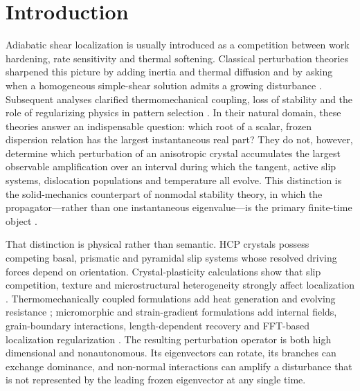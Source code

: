 \section{Introduction}
\label{sec:introduction_dynamic}

Adiabatic shear localization is usually introduced as a competition between work hardening, rate sensitivity and thermal softening. Classical perturbation theories sharpened this picture by adding inertia and thermal diffusion and by asking when a homogeneous simple-shear solution admits a growing disturbance \cite{Bai1982,BaiDodd1992,Wright2002,WrightBatra1985,MolinariClifton1987}. Subsequent analyses clarified thermomechanical coupling, loss of stability and the role of regularizing physics in pattern selection \cite{BenallalBigoni2004,ArriagaWaisman2017,JacqueyRattezVeveakis2021}. In their natural domain, these theories answer an indispensable question: which root of a scalar, frozen dispersion relation has the largest instantaneous real part? They do not, however, determine which perturbation of an anisotropic crystal accumulates the largest observable amplification over an interval during which the tangent, active slip systems, dislocation populations and temperature all evolve. This distinction is the solid-mechanics counterpart of nonmodal stability theory, in which the propagator---rather than one instantaneous eigenvalue---is the primary finite-time object \cite{Schmid2007}.

That distinction is physical rather than semantic. HCP crystals possess competing basal, prismatic and pyramidal slip systems whose resolved driving forces depend on orientation. Crystal-plasticity calculations show that slip competition, texture and microstructural heterogeneity strongly affect localization \cite{FranzAbedMeraimBerveiller2013,ZhangEakinsDunne2016,MouradEtAl2017,AnEtAl2023}. Thermomechanically coupled formulations add heat generation and evolving resistance \cite{LiRomeroSegurado2019,DaiSong2022}; micromorphic and strain-gradient formulations add internal fields, grain-boundary interactions, length-dependent recovery and FFT-based localization regularization \cite{Gurtin2002,Gurtin2008,VanBeersEtAl2013,AlipourReeseWulfinghoff2019,PhalkeEtAl2022,LameJouybariEtAl2024,LameJouybariEtAl2025}. The resulting perturbation operator is both high dimensional and nonautonomous. Its eigenvectors can rotate, its branches can exchange dominance, and non-normal interactions can amplify a disturbance that is not represented by the leading frozen eigenvector at any single time.

